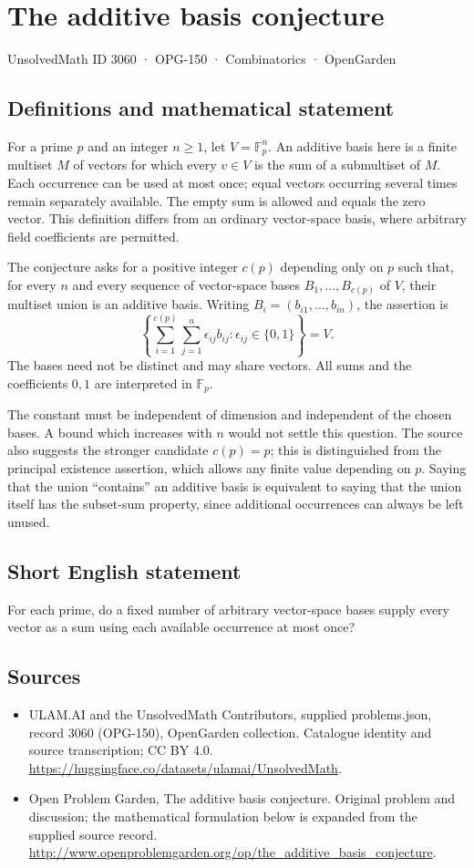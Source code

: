 \documentclass[11pt,a4paper]{article}
\begin{document}
\section*{The additive basis conjecture}\label{3060}
{\small UnsolvedMath ID 3060 · OPG-150 · Combinatorics · OpenGarden}
\subsection{Definitions and mathematical statement}
For a prime $p$ and an integer $n\ge1$, let $V=\mathbb F_p^n$.
An additive basis here is a finite multiset $M$ of vectors for which every
$v\in V$ is the sum of a submultiset of $M$. Each occurrence can be used
at most once; equal vectors occurring several times remain separately
available. The empty sum is allowed and equals the zero vector.
This definition differs from an ordinary vector-space basis, where
arbitrary field coefficients are permitted.

The conjecture asks for a positive integer $c(p)$ depending only on $p$
such that, for every $n$ and every sequence of vector-space bases
$B_1,\ldots,B_{c(p)}$ of $V$, their multiset union is an additive basis.
Writing $B_i=(b_{i1},\ldots,b_{in})$, the assertion is
\[
 \left\{\sum_{i=1}^{c(p)}\sum_{j=1}^n
                 \epsilon_{ij}b_{ij}:\epsilon_{ij}\in\{0,1\}\right\}=V.
\]
The bases need not be distinct and may share vectors. All sums and the
coefficients $0,1$ are interpreted in $\mathbb F_p$.

The constant must be independent of dimension and independent of the
chosen bases. A bound which increases with $n$ would not settle this
question. The source also suggests the stronger candidate $c(p)=p$;
this is distinguished from the principal existence assertion, which
allows any finite value depending on $p$. Saying that the union
``contains'' an additive basis is equivalent to saying that the union
itself has the subset-sum property, since additional occurrences can
always be left unused.
\subsection{Short English statement}
For each prime, do a fixed number of arbitrary vector-space bases supply every vector as a sum using each available occurrence at most once?
\subsection{Sources}
\begin{itemize}
\item[S1] ULAM.AI and the UnsolvedMath Contributors, supplied problems.json, record 3060 (OPG-150), OpenGarden collection. Catalogue identity and source transcription; CC BY 4.0.
\url{https://huggingface.co/datasets/ulamai/UnsolvedMath}.
\item[S2] Open Problem Garden, The additive basis conjecture. Original problem and discussion; the mathematical formulation below is expanded from the supplied source record.
\url{http://www.openproblemgarden.org/op/the_additive_basis_conjecture}.
\end{itemize}
\end{document}

